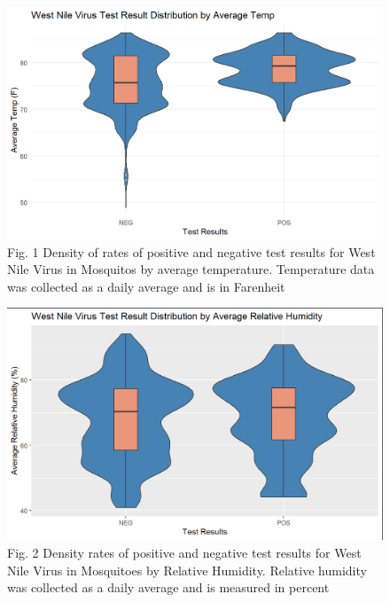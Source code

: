 \documentclass[
  letterpaper,
  DIV=11,
  numbers=noendperiod]{scrartcl}
\begin{document}
\begin{figure}

{\centering \includegraphics[width=8.33333in,height=\textheight]{images/temp_dist.png}

}

\caption{Fig. 1 Density of rates of positive and negative test results
for West Nile Virus in Mosquitos by average temperature. Temperature
data was collected as a daily average and is in Farenheit}

\end{figure}

\begin{figure}

{\centering \includegraphics[width=8.33333in,height=\textheight]{images/rh_dist.png}

}

\caption{Fig. 2 Density rates of positive and negative test results for
West Nile Virus in Mosquitoes by Relative Humidity. Relative humidity
was collected as a daily average and is measured in percent}

\end{figure}
\end{document}
